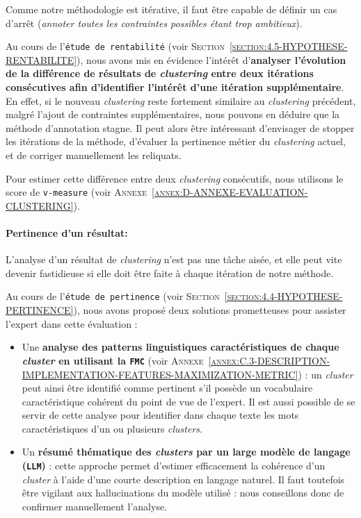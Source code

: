 			Comme notre méthodologie est itérative, il faut être capable de définir un cas d'arrêt (\textit{annoter toutes les contraintes possibles étant trop ambitieux}).
			
			Au cours de l'\texttt{étude de rentabilité} (voir \textsc{Section~\ref{section:4.5-HYPOTHESE-RENTABILITE}}), nous avons mis en évidence l'intérêt d'\textbf{analyser l'évolution de la différence de résultats de \textit{clustering} entre deux itérations consécutives afin d'identifier l'intérêt d'une itération supplémentaire}.
			En effet, si le nouveau \textit{clustering} reste fortement similaire au \textit{clustering} précédent, malgré l'ajout de contraintes supplémentaires, nous pouvons en déduire que la méthode d'annotation stagne.
			Il peut alors être intéressant d'envisager de stopper les itérations de la méthode, d'évaluer la pertinence métier du \textit{clustering} actuel, et de corriger manuellement les reliquats.
			
			Pour estimer cette différence entre deux \textit{clustering} consécutifs, nous utilisons le score de \texttt{v-measure} (voir \textsc{Annexe~\ref{annex:D-ANNEXE-EVALUATION-CLUSTERING}}).
		
		
		\paragraph{\textcolor{colorSilverLakeBlue}{\faCheckSquare} Pertinence d'un résultat:}
			
			L'analyse d'un résultat de \textit{clustering} n'est pas une tâche aisée, et elle peut vite devenir fastidieuse si elle doit être faite à chaque itération de notre méthode.
			
			Au cours de l'\texttt{étude de pertinence} (voir \textsc{Section~\ref{section:4.4-HYPOTHESE-PERTINENCE}}), nous avons proposé deux solutions prometteuses pour assister l'expert dans cette évaluation :
			\begin{itemize}
				\item Une \textbf{analyse des patterns linguistiques caractéristiques de chaque \textit{cluster} en utilisant la \texttt{FMC}} (voir \textsc{Annexe~\ref{annex:C.3-DESCRIPTION-IMPLEMENTATION-FEATURES-MAXIMIZATION-METRIC}}) :
				un \textit{cluster} peut ainsi être identifié comme pertinent s'il possède un vocabulaire caractéristique cohérent du point de vue de l'expert.
				Il est aussi possible de se servir de cette analyse pour identifier dans chaque texte les mots caractéristiques d'un ou plusieurs \textit{clusters}.
				\item Un \textbf{résumé thématique des \textit{clusters} par un large modèle de langage (\texttt{LLM})} :
				cette approche permet d'estimer efficacement la cohérence d'un \textit{cluster} à l'aide d'une courte description en langage naturel.
				Il faut toutefois être vigilant aux hallucinations du modèle utilisé : nous conseillons donc de confirmer manuellement l'analyse.
			\end{itemize}
			
